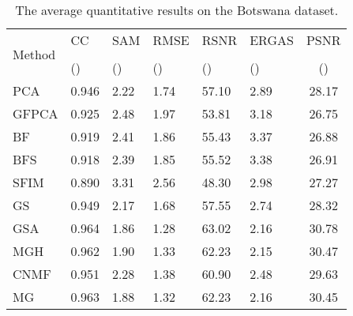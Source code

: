 \documentclass[journal]{IEEEtran}
\begin{document}
\begin{table}[tb]

        \centering
        \caption{The average quantitative results on the Botswana dataset.}
        \begin{tabular}{lp{0.5cm}p{0.5cm}p{0.6cm}p{0.5cm}p{0.6cm}c}
        \hline
        \multirow{3}{*}{Method}                          & CC                & SAM               & RMSE                  & RSNR              & ERGAS             & PSNR  \\
                                        &                   &                   &       &                   &                   & \\
                                        & ()      & ()    &  ()       & ()      & ()    & ()\\
        \hline
        PCA\cite{PCA1}                  & 0.946            & 2.22            & 1.74            & 57.10           & 2.89            & 28.17\\
        GFPCA \cite{GFPCA}              & 0.925            & 2.48            & 1.97            & 53.81           & 3.18            & 26.75\\
        BF \cite{BF}                    & 0.919            & 2.41            & 1.86            & 55.43           & 3.37            & 26.88\\
        BFS \cite{BFS}                  & 0.918            & 2.39            & 1.85            & 55.52           & 3.38            & 26.91\\
        SFIM \cite{SFIM}                & 0.890            & 3.31            & 2.56            & 48.30           & 2.98            & 27.27\\
        GS\cite{GS}                     & 0.949            & 2.17            & 1.68            & 57.55           & 2.74            & 28.32\\
        GSA\cite{GS}                    & 0.964            & 1.86            & 1.28            & 63.02           & 2.16            & 30.78\\
        MGH \cite{MTF-GLP-HPM}          & 0.962            & 1.90            & 1.33            & 62.23           & 2.15            & 30.47\\
        CNMF \cite{CNMF}                & 0.951            & 2.28            & 1.38            & 60.90           & 2.48            & 29.63\\
        MG \cite{MTF-GLP}               & 0.963            & 1.88            & 1.32            & 62.23           & 2.16            & 30.45\\

\end{tabular}
\end{table}
\end{document}
